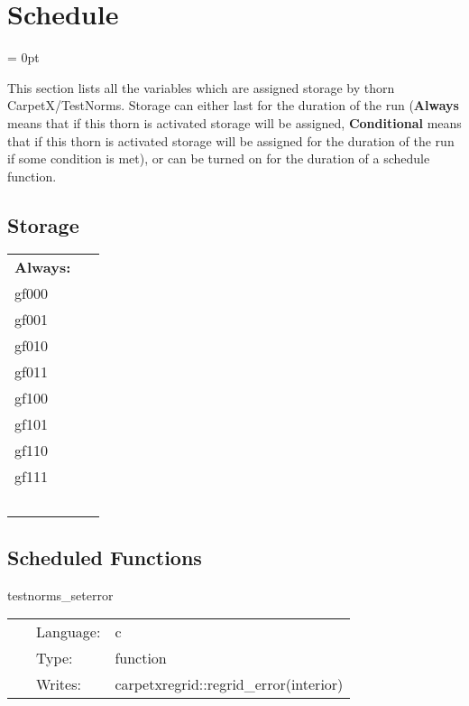 
\section{Schedule} 


\parskip = 0pt


\noindent This section lists all the variables which are assigned storage by thorn CarpetX/TestNorms.  Storage can either last for the duration of the run ({\bf Always} means that if this thorn is activated storage will be assigned, {\bf Conditional} means that if this thorn is activated storage will be assigned for the duration of the run if some condition is met), or can be turned on for the duration of a schedule function.


\subsection*{Storage}

\hspace{5mm}

 \begin{tabular*}{160mm}{ll} 

{\bf Always:}&  ~ \\ 
 gf000 & ~\\ 
 gf001 & ~\\ 
 gf010 & ~\\ 
 gf011 & ~\\ 
 gf100 & ~\\ 
 gf101 & ~\\ 
 gf110 & ~\\ 
 gf111 & ~\\ 
~ & ~\\ 
\end{tabular*} 


\subsection*{Scheduled Functions}
\vspace{5mm}


\hspace{5mm} testnorms\_seterror 

\hspace{5mm}{\it set up test grid } 


\hspace{5mm}

 \begin{tabular*}{160mm}{cll} 
~ & Language:  & c \\ 
~ & Type:  & function \\ 
~ & Writes:  & carpetxregrid::regrid\_error(interior) \\ 
\end{tabular*} 


